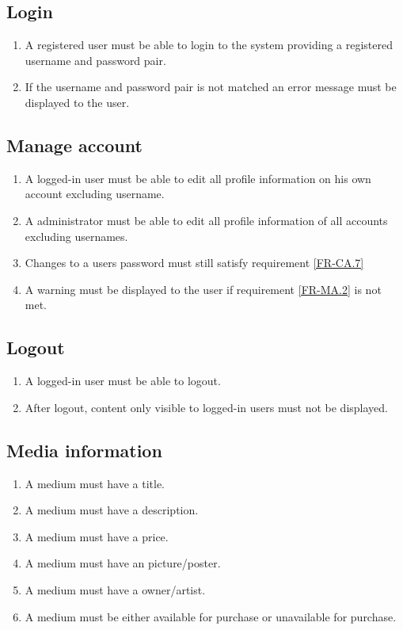 \documentclass[../report.tex]{subfiles}
\begin{document}
\subsection {Login}
	
\begin{enumerate}[label=FR-\twodigits*, resume]
	\item A registered user must be able to login to the system providing a registered username and password pair.
	\item If the username and password pair is not matched an error message must be displayed to the user. 
\end{enumerate}
		
\subsection {Manage account}

\begin{enumerate}[label=FR-\twodigits*, resume]
	\item A logged-in user must be able to edit all profile information on his own account excluding username.
	\item A administrator must be able to edit all profile information of all accounts excluding usernames.
	\item Changes to a users password must still satisfy requirement \ref{FR-CA.7} \label{FR-MA.2}
	\item A warning must be displayed to the user if requirement \ref{FR-MA.2} is not met.	
\end{enumerate}
		
\subsection {Logout}
\begin{enumerate}[label=FR-\twodigits*, resume]
	\item A logged-in user must be able to logout.
	\item After logout, content only visible to logged-in users must not be displayed.
\end{enumerate}
	
\subsection {Media information} \label{FR-Media}

\begin{enumerate}[label=FR-\twodigits*, resume]
	\item A medium must have a title.
	\item A medium must have a description.
	\item A medium must have a price.
	\item A medium must have an picture/poster.
	\item A medium must have a owner/artist.
	\item A medium must be either available for purchase or unavailable for purchase.
\end{enumerate}
\end{document}
